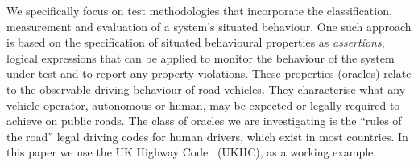 %
%

We specifically focus on test methodologies that incorporate the classification, measurement and evaluation of a system's situated behaviour. One such approach is based on the specification of situated behavioural properties as \emph{assertions}, logical expressions that can be applied 
to monitor the behaviour of the system under test and to report any property violations. 
%
These properties (oracles) relate to the observable driving behaviour of road vehicles. They characterise what any vehicle operator, autonomous or human, %
%
%
may be expected or legally required to achieve on public roads. 
%
The class of oracles we are investigating is the ``rules of the road'' legal driving codes for human drivers, which exist in most countries. In this paper we use the UK Highway Code~\cite{highwayCode} (UKHC), as a working example.


